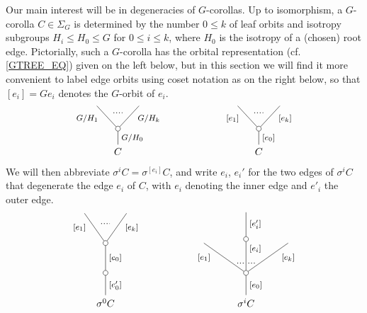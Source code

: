 \documentclass[a4paper,10pt
,draft
]{article}%
\numberwithin{equation}{section}
\numberwithin{figure}{section}
\theoremstyle{definition} %
\newcommand{\1}{\ensuremath{\mathbbm 1}}%
\begin{document}
Our main interest will be in degeneracies of $G$-corollas. 
Up to isomorphism, 
a $G$-corolla $C \in \Sigma_G$ is determined by the number $0 \leq k$ of leaf orbits
and isotropy subgroups
$H_i \leq H_0 \leq G$ for $0 \leq i \leq k$,
where $H_0$ is the isotropy of a (chosen) root edge.
Pictorially, such a $G$-corolla has the orbital representation (cf. \eqref{GTREE_EQ})
given on the left below,
but in this section we will find it more convenient to label edge orbits using coset notation as on the right below,
so that $[e_i] = G e_i$ denotes the $G$-orbit of $e_i$.
\begin{equation}\label{GCOR EQ}
\begin{tikzpicture}
[grow=up,auto,level distance=2.3em,every node/.style = {font=\footnotesize},dummy/.style={circle,draw,inner sep=0pt,minimum size=1.75mm}]
	\node at (0,0) [font=\normalsize]{$C$}
		child{node [dummy] {}
			child{
			edge from parent node [swap,near end] {$G/H_k$} node [name=Kn] {}}
			child{
			edge from parent node [near end] {$G/H_1$}
node [name=Kone,swap] {}}
		edge from parent node [swap] {$G/H_0$}
		};
		\draw [dotted,thick] (Kone) -- (Kn) ;
	\node at (5,0) [font=\normalsize]{$C$}
		child{node [dummy] {}
			child{
			edge from parent node [swap,near end] {$[e_k]$} node [name=Kn] {}}
			child{
			edge from parent node [near end] {$[e_1]$}
node [name=Kone,swap] {}}
		edge from parent node [swap] {$[e_0]$}
		};
		\draw [dotted,thick] (Kone) -- (Kn) ;
\end{tikzpicture}
\end{equation}
We will then abbreviate $\sigma^i C = \sigma^{[e_i]} C$, and write $e_i$, $e_i'$ for the two edges of $\sigma^i C $ that degenerate the edge $e_i$ of $C$,
with $e_i$ denoting the inner edge and $e'_i$ the outer
edge.
\begin{equation}\label{DEGGCOR EQ}
\begin{tikzpicture}
[grow=up,auto,level distance=3em,
every node/.style = {font=\footnotesize},
dummy/.style={circle,draw,inner sep=0pt,minimum size=1.75mm}]
	\node at (0,0) [font=\normalsize]{$\sigma^0 C$}
		child{node [dummy] {}
			child{node [dummy] {}
				child{
				edge from parent node [swap,near end] {$[e_k]$} node [name=Kn] {}}
				child{
				edge from parent node [near end] {$[e_1]$}
node [name=Kone,swap] {}}
			edge from parent node [swap] {$[e_0]$}}
		edge from parent node [swap] {$[e'_0]$}
		};
		\draw [dotted,thick] (Kone) -- (Kn) ;
	\node at (5,0) [font=\normalsize]{$\sigma^i C$}
		child{node [dummy] {}
			child{
			edge from parent node [swap,near end] {$[e_k]$} node [near start,inner sep=1pt,name=Kn] {}}
			child[level distance=3.4em]{node [dummy] {}
				child[level distance=2.7em]{
				edge from parent node [swap] {$[e'_i]$}
}
			edge from parent node [near end,swap] {$[e_i]$}
node [near start,inner sep=1pt,name=Kone,swap] {}
node [near start,inner sep=1pt,name=Kone1] {}}
			child{
			edge from parent node [near end] {$[e_1]$}
node [swap] {}
node [near start,inner sep=1pt,name=Kn1,swap]{}}
		edge from parent node [swap] {$[e_0]$}
		};
		\draw [dotted,thick] (Kone) -- (Kn) ;
		\draw [dotted,thick] (Kone1) -- (Kn1) ;
\end{tikzpicture}
\end{equation}
\end{document}
